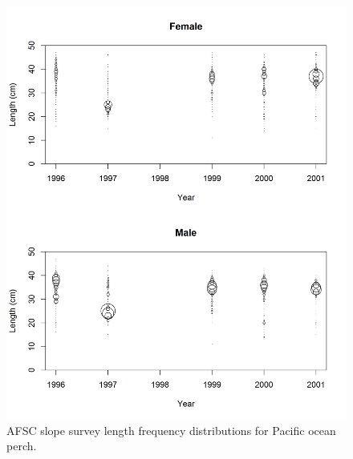 \documentclass[12pt,]{article}
\begin{document}
\FloatBarrier

\begin{figure}
\centering
\includegraphics{Figures/AFSCslope_Lengths.png}
\caption{AFSC slope survey length frequency distributions for Pacific
ocean perch. \label{fig:afsc_Length}}
\end{figure}

\FloatBarrier
\end{document}
